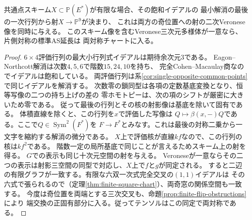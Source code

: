 \begin{proposition}[有限な共通点スキームの固有な二乗像]\label{prop:single-opposite-intrinsic-square}
共通点スキーム$X\subset\mathbb P(E^*)$が有限な場合、その飽和イデアルの
最小解消の最後の一次行列から射$X\to\mathbb P^9$が決まり、
これは両方の奇位置への射の二次Veronese像を同時に与える。
このスキーム像を含むVeronese三次元多様体が一意なら、片側対称の標準AS延長は
両対称チャートに入る。
\end{proposition}
\begin{proof}
$6\times4$評価行列の最大小行列式イデアルは期待余次元3である。
Eagon--Northcott解消は次数$4,5,6$で階数$15,24,10$を持ち、
完全Cohen--Macaulay商なのでイデアルは飽和している。
両評価行列は系\ref{cor:single-opposite-common-points}で同じイデアルを解消する。
次数零の鎖同型は各項の定数基底変換となり、恒等写像の二つの持ち上げの差の
零ホモトピーは、次の項のシフトが厳密に大きいため零である。
従って最後の行列とその核の射影像は基底を除いて固有である。
体積直線を除くと、この行列を$x$で評価した写像は
$Q\mapsto\beta(x,-) Q$である。ここで$Q\in\operatorname{Sym}^2(F^*)$を
$F\to F^*$とみなす。これは最後の対称二乗から一文字を縮約する解消の微分である。
$X$上で評価核が直線$kf$なので、この行列の核は$kf^2$である。
階数一定の局所基底で同じことが言えるためスキーム上の射を得る。
$G$での表示も同じ十次元空間の射を与える。
Veroneseが一意ならその二つの表示は射影三空間の同型で対応し、$X$上で$f$と$g$が同定される。
すると二辺の有限グラフが一致する。有限な六双一次式完全交叉の$(1,1)$イデアルは
その六式で張られるので（定理\ref{thm:finite-square-chart}）、両奇窓の関係空間も一致する。
今度は奇位置を両端とする三次交叉も、命題\ref{prop:finite-flip-obstructions}により
端交換の正固有部分に入る。従ってテンソルはこの同定で両対称である。
\end{proof}

